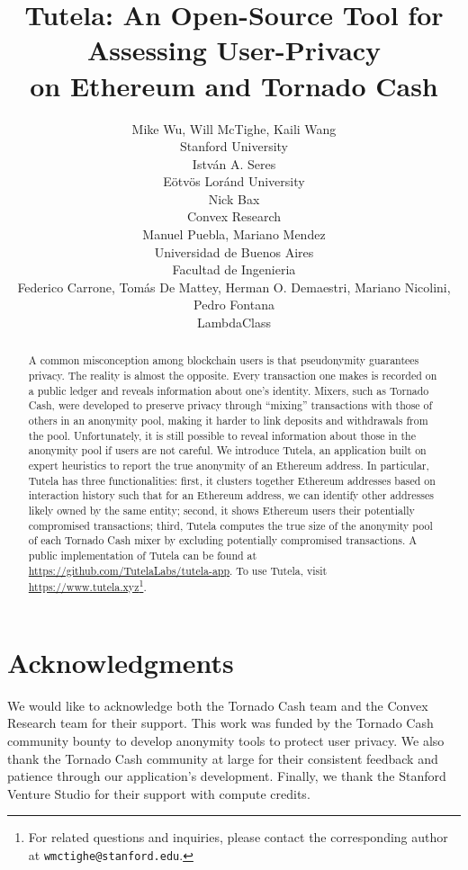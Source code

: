\documentclass[11pt,a4paper]{article}
\title{Tutela: An Open-Source Tool for Assessing User-Privacy \\ on Ethereum and Tornado Cash}
\author{
  \small{Mike Wu, Will McTighe, Kaili Wang}\\
  \small{Stanford University} \\ \And
  \small{Istv\'{a}n A. Seres} \\
  \small{E\"{o}tv\"{o}s Lor\'{a}nd University} \\ \AND
  \small{Nick Bax} \\
  \small{Convex Research} \\ \And
  \small{Manuel Puebla, Mariano Mendez}\\
  \small{Universidad de Buenos Aires}\\
  \small{Facultad de Ingenieria}\\ \AND
  \small{Federico Carrone, Tomás De Mattey,  Herman O. Demaestri, Mariano Nicolini, Pedro Fontana} \\
  \small{LambdaClass} \\}
\date{}
\begin{document}
\maketitle
\begin{abstract}
A common misconception among blockchain users is that pseudonymity guarantees privacy. The reality is almost the opposite. Every transaction one makes is recorded on a public ledger and reveals information about one's identity.
Mixers, such as Tornado Cash, were developed to preserve privacy through ``mixing'' transactions with those of others in an anonymity pool, making it harder to link deposits and withdrawals from the pool. Unfortunately, it is still possible to reveal information about those in the anonymity pool if users are not careful.
We introduce Tutela, an application built on expert heuristics to report the true anonymity of an Ethereum address.
In particular, Tutela has three functionalities: first, it clusters together Ethereum addresses based on interaction history such that for an Ethereum address, we can identify other addresses likely owned by the same entity; second, it shows Ethereum users their potentially compromised transactions; third, Tutela computes the true size of the anonymity pool of each Tornado Cash mixer by excluding potentially compromised transactions. A public implementation of Tutela can be found at \url{https://github.com/TutelaLabs/tutela-app}. To use Tutela, visit \url{https://www.tutela.xyz}\footnote{For related questions and inquiries, please contact the corresponding author at \texttt{wmctighe@stanford.edu}.}.
\end{abstract}










\section*{Acknowledgments}
We would like to acknowledge both the Tornado Cash team and the Convex Research team for their support. This work was funded by the Tornado Cash community bounty to develop anonymity tools to protect user privacy. We also thank the Tornado Cash community at large for their consistent feedback and patience through our application's development. Finally, we thank the Stanford Venture Studio for their support with compute credits.

\appendix




\end{document}
